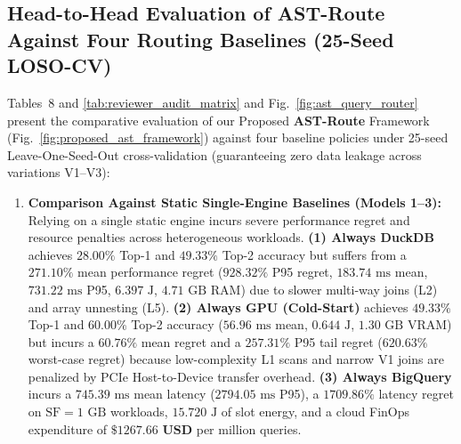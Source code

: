 \documentclass[10pt,a4paper]{article}
\begin{document}
\subsection{Head-to-Head Evaluation of AST-Route Against Four Routing Baselines (25-Seed LOSO-CV)}
Tables~8 and \ref{tab:reviewer_audit_matrix} and Fig.~\ref{fig:ast_query_router} present the comparative evaluation of our Proposed \textbf{AST-Route} Framework (Fig.~\ref{fig:proposed_ast_framework}) against four baseline policies under 25-seed Leave-One-Seed-Out cross-validation (guaranteeing zero data leakage across variations V1--V3):
\begin{enumerate}[leftmargin=1.5em,itemsep=2pt]
    \item \textbf{Comparison Against Static Single-Engine Baselines (Models 1--3):} Relying on a single static engine incurs severe performance regret and resource penalties across heterogeneous workloads. \textbf{(1) Always DuckDB} achieves $28.00\%$ Top-1 and $49.33\%$ Top-2 accuracy but suffers from a $\mathbf{271.10\%}$ mean performance regret ($928.32\%$ P95 regret, $183.74\text{ ms}$ mean, $731.22\text{ ms}$ P95, $6.397\text{ J}$, $4.71\text{ GB}$ RAM) due to slower multi-way joins (L2) and array unnesting (L5). \textbf{(2) Always GPU (Cold-Start)} achieves $49.33\%$ Top-1 and $60.00\%$ Top-2 accuracy ($56.96\text{ ms}$ mean, $0.644\text{ J}$, $1.30\text{ GB}$ VRAM) but incurs a $\mathbf{60.76\%}$ mean regret and a $\mathbf{257.31\%}$ P95 tail regret ($620.63\%$ worst-case regret) because low-complexity L1 scans and narrow V1 joins are penalized by PCIe Host-to-Device transfer overhead. \textbf{(3) Always BigQuery} incurs a $745.39\text{ ms}$ mean latency ($2794.05\text{ ms}$ P95), a $\mathbf{1709.86\%}$ latency regret on $\text{SF}=1\text{ GB}$ workloads, $15.720\text{ J}$ of slot energy, and a cloud FinOps expenditure of $\mathbf{\$1267.66\text{ USD}}$ per million queries.

\end{enumerate}
\end{document}
